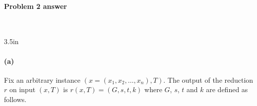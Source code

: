 

\newpage

\paragraph{Problem 2 answer}~


\noindent\begin{answerBox}{3.5in}   %

\paragraph{(a)}  


Fix an arbitrary  instance $(x=(x_1, x_2, \ldots, x_n), T)$.
The output of the reduction $r$ on input $(x, T)$ is $r(x, T)=(G, s, t, k)$ where $G$, $s$, $t$ and $k$ are defined as follows.

\bigskip 

\begin{blue}

  \REPLACEME
  
\end{blue}

\end{answerBox}


